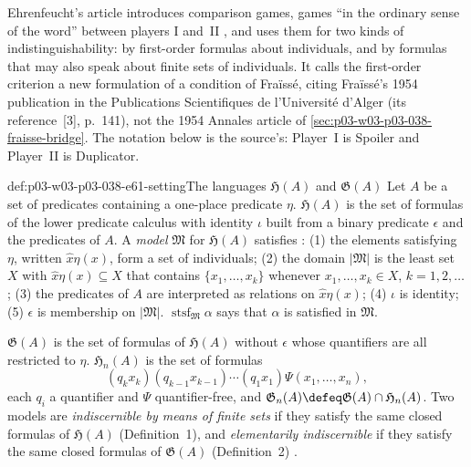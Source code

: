 Ehrenfeucht's article \cite{Ehrenfeucht1961} introduces comparison games,
games ``in the ordinary sense of the word'' between players I and~II
\cite[\S I.2, p.~130]{Ehrenfeucht1961}, and uses them for two kinds of
indistinguishability: by first-order formulas about individuals, and by
formulas that may also speak about finite sets of individuals. It calls the
first-order criterion a new formulation of a condition of Fra\"iss\'e, citing
Fra\"iss\'e's 1954 publication in the Publications Scientifiques de
l'Universit\'e d'Alger (its reference~[3], p.~141), not the 1954 Annales
article of \cref{sec:p03-w03-p03-038-fraisse-bridge}. The notation below is
the source's: Player~I is Spoiler and Player~II is Duplicator.

\begin{hbdefinition}{def:p03-w03-p03-038-e61-setting}{The languages \(\mathfrak H(A)\) and \(\mathfrak G(A)\)}
Let \(A\) be a set of predicates containing a one-place predicate \(\eta\).
\(\mathfrak H(A)\) is the set of formulas of the lower predicate calculus
with identity \(\iota\) built from a binary predicate \(\epsilon\) and the
predicates of \(A\). A \emph{model} \(\mathfrak M\) for \(\mathfrak H(A)\)
satisfies \cite[\S I.1, p.~129]{Ehrenfeucht1961}:
(1) the elements satisfying \(\eta\), written \(\hat x\eta(x)\), form a set
of individuals; (2) the domain \(|\mathfrak M|\) is the least set \(X\)
with \(\hat x\eta(x)\subseteq X\) that contains \(\{x_1,\ldots,x_k\}\)
whenever \(x_1,\ldots,x_k\in X\), \(k=1,2,\ldots\); (3) the predicates of
\(A\) are interpreted as relations on \(\hat x\eta(x)\); (4) \(\iota\) is
identity; (5) \(\epsilon\) is membership on \(|\mathfrak M|\).
\(\operatorname{stsf}_{\mathfrak M}\alpha\) says that \(\alpha\) is
satisfied in \(\mathfrak M\).

\(\mathfrak G(A)\) is the set of formulas of \(\mathfrak H(A)\) without
\(\epsilon\) whose quantifiers are all restricted to \(\eta\).
\(\mathfrak H_n(A)\) is the set of formulas
\[
(q_kx_k)(q_{k-1}x_{k-1})\cdots(q_1x_1)\Psi(x_1,\ldots,x_n),
\]
each \(q_i\) a quantifier and \(\Psi\) quantifier-free, and
\(\mathfrak G_n(A)\defeq\mathfrak G(A)\cap\mathfrak H_n(A)\).
Two models are \emph{indiscernible by means of finite sets} if they satisfy
the same closed formulas of \(\mathfrak H(A)\) (Definition~1), and
\emph{elementarily indiscernible} if they satisfy the same closed formulas of
\(\mathfrak G(A)\) (Definition~2) \cite[pp.~129--130]{Ehrenfeucht1961}.
\end{hbdefinition}

